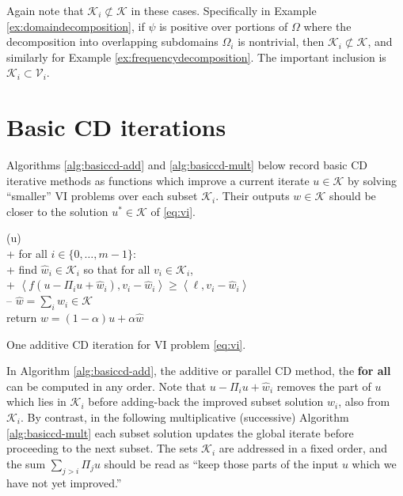 \documentclass[letterpaper,final,12pt,reqno]{amsart}
\theoremstyle{cstyle}
\theoremstyle{cstyle*}
\theoremstyle{dstyle}
\numberwithin{equation}{section}
\numberwithin{figure}{section}
\numberwithin{table}{section}
\numberwithin{theorem}{section}
\newcommand{\cK}{\mathcal{K}}
\newcommand{\cV}{\mathcal{V}}
\newcommand{\ip}[2]{\left<#1,#2\right>}
\begin{document}
Again note that $\cK_i \not\subset \cK$ in these cases.  Specifically in Example \ref{ex:domaindecomposition}, if $\psi$ is positive over portions of $\Omega$ where the decomposition into overlapping subdomains $\Omega_i$ is nontrivial, then $\cK_i \not\subset \cK$, and similarly for Example \ref{ex:frequencydecomposition}.  The important inclusion is $\cK_i \subset \cV_i$.


\section{Basic CD iterations} \label{sec:cditers}

Algorithms \ref{alg:basiccd-add} and \ref{alg:basiccd-mult} below record basic CD iterative methods as functions which improve a current iterate $u \in \cK$ by solving ``smaller'' VI problems over each subset $\cK_i$.   Their outputs $w\in\cK$ should be closer to the solution $u^* \in \cK$ of \eqref{eq:vi}.

\begin{pseudofloat}[H]
\begin{pseudo*}
(u)\text{:} \\+
    for all $i \in \{0,\dots,m-1\}$: \\+
        \rm{find} $\hat w_i\in \cK_i$ \rm{so that for all} $v_i\in \cK_i$, \\+
            $\boxed{\ip{f(u - \Pi_i u + \hat w_i)}{v_i-\hat w_i} \ge \ip{\ell}{v_i-\hat w_i}}$ \\--
    $\hat w = \sum_i \hat w_i\in\cK$ \\
    return $w=(1-\alpha) u + \alpha \hat w$
\end{pseudo*}
\caption{One additive CD iteration for VI problem \eqref{eq:vi}.}
\label{alg:basiccd-add}
\end{pseudofloat}

In Algorithm \ref{alg:basiccd-add}, the additive or parallel CD method, the \textbf{for all} can be computed in any order.  Note that $u-\Pi_iu+\hat w_i$ removes the part of $u$ which lies in $\mathcal{K}_i$ before adding-back the improved subset solution $\hat w_i$, also from $\mathcal{K}_i$.  By contrast, in the following multiplicative (successive) Algorithm \ref{alg:basiccd-mult} each subset solution updates the global iterate before proceeding to the next subset.  The sets $\mathcal{K}_i$ are addressed in a fixed order, and the sum $\sum_{j>i} \Pi_j u$ should be read as ``keep those parts of the input $u$ which we have not yet improved.''
\end{document}
